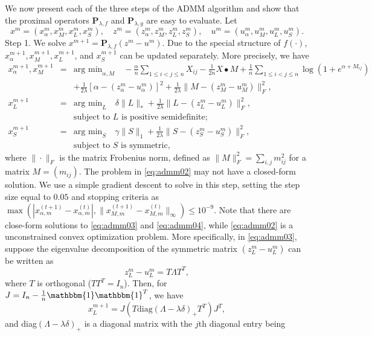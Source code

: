\documentclass[AMS,STIX1COL]{WileyNJD-v2}
\begin{document}
{We now present each of the three steps of the ADMM algorithm and show that the proximal
operators $\mathbf{P}_{\lambda,f}$ and $\mathbf{P}_{\lambda,g}$ are easy to evaluate.
Let
$$
x^m = (x^m_\alpha, x^m_M, x^m_L, x^m_S), \quad
z^m = (z^m_\alpha, z^m_M, z^m_L, z^m_S), \quad
u^m = (u^m_\alpha, u^m_M, u^m_L, u^m_S).
$$
Step 1. We solve $x^{m+1} = \mathbf{P}_{\lambda,f}(z^m - u^m)$.
Due to the special structure of $f(\cdot)$,
$x^{m+1}_\alpha, x^{m+1}_M, x^{m+1}_L$, and $x^{m+1}_S$
can be updated separately.
More precisely, we have
\begin{eqnarray}
x^{m+1}_\alpha, x^{m+1}_M &=& \mbox{arg min}_{\alpha, M} \quad
-\frac{\alpha}{n} \sum_{1\le i< j\le n}X_{ij}
-\frac{1}{2n} X \bullet M
+ \frac{1}{n} \sum_{1\le i<j\le n} \log \left(1 + e^{\alpha + M_{ij}}\right) \nonumber \\
&& + \frac{1}{2\lambda}\left[\alpha - (z^m_\alpha - u^m_\alpha)\right]^2
+ \frac{1}{2\lambda}\|M - (z^m_M - u^m_M)\|^2_F, \label{eq:admm02} \\
x^{m+1}_L &=& \mbox{arg min}_{ L} \quad \delta \|L\|_\ast
+ \frac{1}{2\lambda}\|L - (z^m_L - u^m_L)\|^2_F,\label{eq:admm03}
\\
&& \mbox{subject to $L$ is positive semidefinite;} \nonumber \\
x^{m+1}_S &=& \mbox{arg min}_{ S} \quad  \gamma \|S\|_1
+ \frac{1}{2\lambda}\|S - (z^m_S - u^m_S)\|^2_F,
\label{eq:admm04}
\\
&& \mbox{subject to $S$ is symmetric,} \nonumber
\end{eqnarray}
where $\|\cdot\|_F$ is the matrix Frobenius norm, defined as
$\|M\|^2_F = \sum_{i,j} m^2_{ij}$ for a matrix $M = (m_{ij})$.
The problem in \eqref{eq:admm02} may not have a closed-form solution.
We use a simple gradient descent to solve in this step, setting the step size equal to $0.05$ and stopping criteria as $\max(|x_{\alpha,m}^{(t+1)}-x_{\alpha,m}^{(t)}|,\|x_{M,m}^{(t+1)}-x_{M,m}^{(t)}\|_{\infty}) \leq 10^{-9}$.
Note that there are close-form solutions to \eqref{eq:admm03} and \eqref{eq:admm04}, while \eqref{eq:admm02} is a unconstrained convex optimization problem.
More specifically, in \eqref{eq:admm03}, suppose the eigenvalue decomposition of the symmetric matrix $(z^m_L - u^m_L)$ can be written as
$$
z^m_L - u^m_L = T \Lambda T^T,
$$
where $T$ is orthogonal ($T T^T = I_n$). Then, for $J=I_{n}-\frac{1}{n}\mathbbm{1}\mathbbm{1}^T$, we have
$$
x^{m+1}_L = J (T \mbox{diag}(\Lambda-\lambda \delta)_+ T^T)J^{T},
$$
and diag$(\Lambda-\lambda \delta)_+$ is a diagonal matrix with the $j$th
diagonal entry being
}
\end{document}
